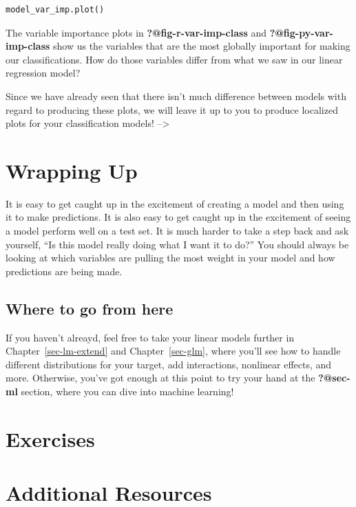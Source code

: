 \documentclass[
  letterpaper,
]{krantz}
\begin{document}
\begin{verbatim}
model_var_imp.plot()
\end{verbatim}

The variable importance plots in \textbf{?@fig-r-var-imp-class} and
\textbf{?@fig-py-var-imp-class} show us the variables that are the most
globally important for making our classifications. How do those
variables differ from what we saw in our linear regression model?

Since we have already seen that there isn't much difference between
models with regard to producing these plots, we will leave it up to you
to produce localized plots for your classification models!
--\textgreater{}

\section{Wrapping Up}\label{wrapping-up}

It is easy to get caught up in the excitement of creating a model and
then using it to make predictions. It is also easy to get caught up in
the excitement of seeing a model perform well on a test set. It is much
harder to take a step back and ask yourself, ``Is this model really
doing what I want it to do?'' You should always be looking at which
variables are pulling the most weight in your model and how predictions
are being made.

\subsection{Where to go from here}\label{where-to-go-from-here}

If you haven't alreayd, feel free to take your linear models further in
Chapter~\ref{sec-lm-extend} and Chapter~\ref{sec-glm}, where you'll see
how to handle different distributions for your target, add interactions,
nonlinear effects, and more. Otherwise, you've got enough at this point
to try your hand at the \textbf{?@sec-ml} section, where you can dive
into machine learning!

\section{Exercises}\label{exercises}

\section{Additional Resources}\label{additional-resources}
\end{document}
